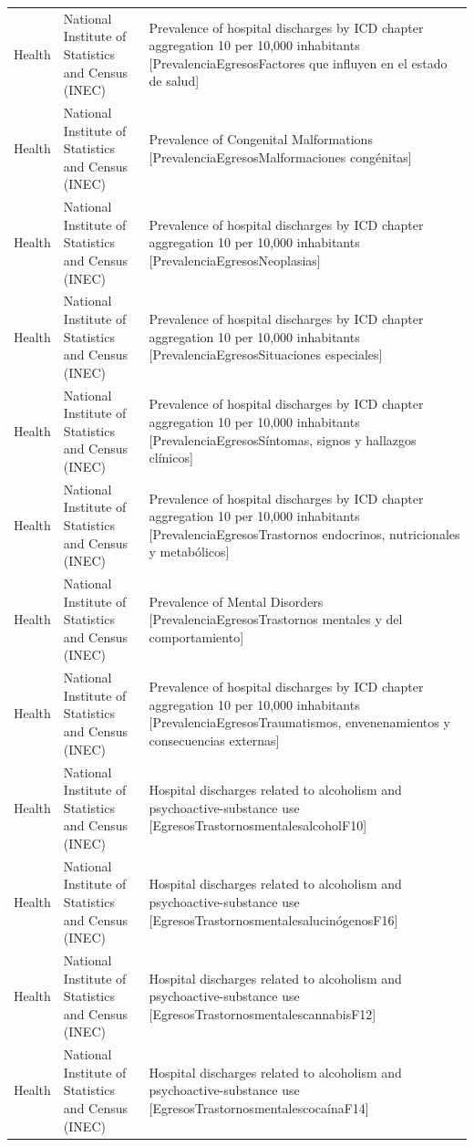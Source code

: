 \documentclass[10pt,a4paper]{article}
\begin{document}
\begin{longtable}{@{}>{\raggedright\arraybackslash}p{3.5cm}>{\raggedright\arraybackslash}p{5.6cm}>{\raggedright\arraybackslash}p{\dimexpr\textwidth-9.1cm-4\tabcolsep\relax}@{}}
Health & National Institute of Statistics and Census (INEC) & Prevalence of hospital discharges by ICD chapter aggregation 10 per 10,000 inhabitants [PrevalenciaEgresosFactores que influyen en el estado de salud]\\
Health & National Institute of Statistics and Census (INEC) & Prevalence of Congenital Malformations [PrevalenciaEgresosMalformaciones cong\'{e}nitas]\\
Health & National Institute of Statistics and Census (INEC) & Prevalence of hospital discharges by ICD chapter aggregation 10 per 10,000 inhabitants [PrevalenciaEgresosNeoplasias]\\
Health & National Institute of Statistics and Census (INEC) & Prevalence of hospital discharges by ICD chapter aggregation 10 per 10,000 inhabitants [PrevalenciaEgresosSituaciones especiales]\\
Health & National Institute of Statistics and Census (INEC) & Prevalence of hospital discharges by ICD chapter aggregation 10 per 10,000 inhabitants [PrevalenciaEgresosS\'{i}ntomas, signos y hallazgos cl\'{i}nicos]\\
Health & National Institute of Statistics and Census (INEC) & Prevalence of hospital discharges by ICD chapter aggregation 10 per 10,000 inhabitants [PrevalenciaEgresosTrastornos endocrinos, nutricionales y metab\'{o}licos]\\
Health & National Institute of Statistics and Census (INEC) & Prevalence of Mental Disorders [PrevalenciaEgresosTrastornos mentales y del comportamiento]\\
Health & National Institute of Statistics and Census (INEC) & Prevalence of hospital discharges by ICD chapter aggregation 10 per 10,000 inhabitants [PrevalenciaEgresosTraumatismos, envenenamientos y consecuencias externas]\\
Health & National Institute of Statistics and Census (INEC) & Hospital discharges related to alcoholism and psychoactive-substance use [EgresosTrastornosmentalesalcoholF10]\\
Health & National Institute of Statistics and Census (INEC) & Hospital discharges related to alcoholism and psychoactive-substance use [EgresosTrastornosmentalesalucin\'{o}genosF16]\\
Health & National Institute of Statistics and Census (INEC) & Hospital discharges related to alcoholism and psychoactive-substance use [EgresosTrastornosmentalescannabisF12]\\
Health & National Institute of Statistics and Census (INEC) & Hospital discharges related to alcoholism and psychoactive-substance use [EgresosTrastornosmentalescoca\'{i}naF14]\\

\end{longtable}
\end{document}
